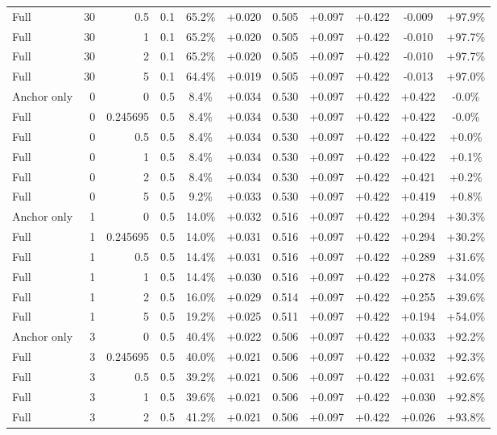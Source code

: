\begin{table}[htbp]
\begin{tabular}{lrrrccccccc}
Full & 30 & 0.5 & 0.1 & 65.2\% & +0.020 & 0.505 & +0.097 & +0.422 & -0.009 & +97.9\% \\
Full & 30 & 1 & 0.1 & 65.2\% & +0.020 & 0.505 & +0.097 & +0.422 & -0.010 & +97.7\% \\
Full & 30 & 2 & 0.1 & 65.2\% & +0.020 & 0.505 & +0.097 & +0.422 & -0.010 & +97.7\% \\
Full & 30 & 5 & 0.1 & 64.4\% & +0.019 & 0.505 & +0.097 & +0.422 & -0.013 & +97.0\% \\
Anchor only & 0 & 0 & 0.5 & 8.4\% & +0.034 & 0.530 & +0.097 & +0.422 & +0.422 & -0.0\% \\
Full & 0 & 0.245695 & 0.5 & 8.4\% & +0.034 & 0.530 & +0.097 & +0.422 & +0.422 & -0.0\% \\
Full & 0 & 0.5 & 0.5 & 8.4\% & +0.034 & 0.530 & +0.097 & +0.422 & +0.422 & +0.0\% \\
Full & 0 & 1 & 0.5 & 8.4\% & +0.034 & 0.530 & +0.097 & +0.422 & +0.422 & +0.1\% \\
Full & 0 & 2 & 0.5 & 8.4\% & +0.034 & 0.530 & +0.097 & +0.422 & +0.421 & +0.2\% \\
Full & 0 & 5 & 0.5 & 9.2\% & +0.033 & 0.530 & +0.097 & +0.422 & +0.419 & +0.8\% \\
Anchor only & 1 & 0 & 0.5 & 14.0\% & +0.032 & 0.516 & +0.097 & +0.422 & +0.294 & +30.3\% \\
Full & 1 & 0.245695 & 0.5 & 14.0\% & +0.031 & 0.516 & +0.097 & +0.422 & +0.294 & +30.2\% \\
Full & 1 & 0.5 & 0.5 & 14.4\% & +0.031 & 0.516 & +0.097 & +0.422 & +0.289 & +31.6\% \\
Full & 1 & 1 & 0.5 & 14.4\% & +0.030 & 0.516 & +0.097 & +0.422 & +0.278 & +34.0\% \\
Full & 1 & 2 & 0.5 & 16.0\% & +0.029 & 0.514 & +0.097 & +0.422 & +0.255 & +39.6\% \\
Full & 1 & 5 & 0.5 & 19.2\% & +0.025 & 0.511 & +0.097 & +0.422 & +0.194 & +54.0\% \\
Anchor only & 3 & 0 & 0.5 & 40.4\% & +0.022 & 0.506 & +0.097 & +0.422 & +0.033 & +92.2\% \\
Full & 3 & 0.245695 & 0.5 & 40.0\% & +0.021 & 0.506 & +0.097 & +0.422 & +0.032 & +92.3\% \\
Full & 3 & 0.5 & 0.5 & 39.2\% & +0.021 & 0.506 & +0.097 & +0.422 & +0.031 & +92.6\% \\
Full & 3 & 1 & 0.5 & 39.6\% & +0.021 & 0.506 & +0.097 & +0.422 & +0.030 & +92.8\% \\
Full & 3 & 2 & 0.5 & 41.2\% & +0.021 & 0.506 & +0.097 & +0.422 & +0.026 & +93.8\% \\

\end{tabular}
\end{table}
